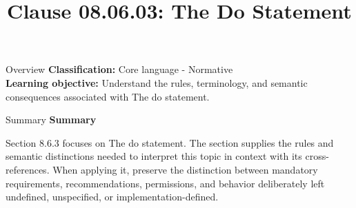 \documentclass[10pt,letterpaper]{article}
\title{Clause 08.06.03: The Do Statement}
\author{}
\date{}
\begin{document}
\maketitle
\begin{CornellOverviewBox}{Overview}
\textbf{Classification:} Core language - Normative\\[2pt]
\textbf{Learning objective:} Understand the rules, terminology, and semantic consequences associated with The do statement.
\end{CornellOverviewBox}\begin{CornellSummaryBox}{Summary}
{\sffamily\bfseries\color{Accent} Summary}\par\vspace{3pt}Section 8.6.3 focuses on The do statement. The section supplies the rules and semantic distinctions needed to interpret this topic in context with its cross-references. When applying it, preserve the distinction between mandatory requirements, recommendations, permissions, and behavior deliberately left undefined, unspecified, or implementation-defined.
\end{CornellSummaryBox}
\end{document}

